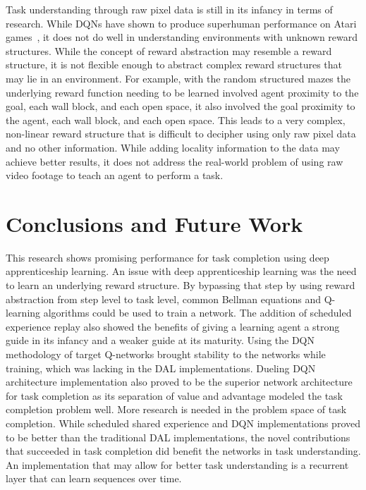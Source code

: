 \documentclass[12pt,american]{report}
\begin{document}
Task understanding through raw pixel data is still in its infancy in terms of research.  While DQNs have shown to produce superhuman performance on Atari games~\cite{atari}, it does not do well in understanding environments with unknown reward structures.  While the concept of reward abstraction may resemble a reward structure, it is not flexible enough to abstract complex reward structures that may lie in an environment.  For example, with the random structured mazes the underlying reward function needing to be learned involved agent proximity to the goal, each wall block, and each open space, it also involved the goal proximity to the agent, each wall block, and each open space.  This leads to a very complex, non-linear reward structure that is difficult to decipher using only raw pixel data and no other information.  While adding locality information to the data may achieve better results, it does not address the real-world problem of using raw video footage to teach an agent to perform a task. 


\chapter{Conclusions and Future Work}
\label{sec:conclusions}
This research shows promising performance for task completion using deep apprenticeship learning.  An issue with deep apprenticeship learning was the need to learn an underlying reward structure.  By bypassing that step by using reward abstraction from step level to task level, common Bellman equations and Q-learning algorithms could be used to train a network.  The addition of scheduled experience replay also showed the benefits of giving a learning agent a strong guide in its infancy and a weaker guide at its maturity.  Using the DQN methodology of target Q-networks brought stability to the networks while training, which was lacking in the DAL implementations.  Dueling DQN architecture implementation also proved to be the superior network architecture for task completion as its separation of value and advantage modeled the task completion problem well.  More research is needed in the problem space of task completion.  While scheduled shared experience and DQN implementations proved to be better than the traditional DAL implementations, the novel contributions that succeeded in task completion did benefit the networks in task understanding. An implementation that may allow for better task understanding is a recurrent layer that can learn sequences over time. 
\end{document}
